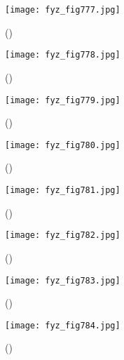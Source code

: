     \begin{figure}[ht!] %
      \centering
      \texttt{[image: fyz\_fig777.jpg]}
      \caption{
               (\cite[s.~707]{Feynman02})}
      \label{fyz:fig777}
    \end{figure}

    \begin{figure}[ht!] %
      \centering
      \texttt{[image: fyz\_fig778.jpg]}
      \caption{
               (\cite[s.~707]{Feynman02})}
      \label{fyz:fig778}
    \end{figure}

    \begin{figure}[ht!] %
      \centering
      \texttt{[image: fyz\_fig779.jpg]}
      \caption{
               (\cite[s.~707]{Feynman02})}
      \label{fyz:fig779}
    \end{figure}

    \begin{figure}[ht!] %
      \centering
      \texttt{[image: fyz\_fig780.jpg]}
      \caption{
               (\cite[s.~707]{Feynman02})}
      \label{fyz:fig780}
    \end{figure}

    \begin{figure}[ht!] %
      \centering
      \texttt{[image: fyz\_fig781.jpg]}
      \caption{
               (\cite[s.~707]{Feynman02})}
      \label{fyz:fig781}
    \end{figure}

    \begin{figure}[ht!] %
      \centering
      \texttt{[image: fyz\_fig782.jpg]}
      \caption{
               (\cite[s.~707]{Feynman02})}
      \label{fyz:fig782}
    \end{figure}

    \begin{figure}[ht!] %
      \centering
      \texttt{[image: fyz\_fig783.jpg]}
      \caption{
               (\cite[s.~707]{Feynman02})}
      \label{fyz:fig783}
    \end{figure}

    \begin{figure}[ht!] %
      \centering
      \texttt{[image: fyz\_fig784.jpg]}
      \caption{
               (\cite[s.~707]{Feynman02})}
      \label{fyz:fig784}
    \end{figure}

